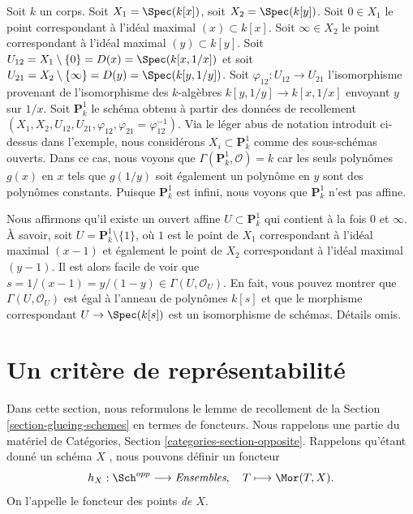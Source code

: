 \begin{example}
\label{example-projective-line}
Soit  $k$  un corps. Soit  $X_1 = \Spec(k[x])$, soit  $X_2 = \Spec(k[y])$. Soit
 $0 \in X_1$  le point correspondant à l'idéal maximal  $(x) \subset k[x]$. Soit
 $\infty \in X_2$  le point correspondant à l'idéal maximal  $(y) \subset k[y]$. Soit
 $U_{12} = X_1 \setminus \{0\} = D(x) = \Spec(k[x, 1/x])$  et soit  $U_{21} = X_2 \setminus \{\infty\} = D(y) = \Spec(k[y, 1/y])$. Soit  $\varphi_{12} : U_{12} \to U_{21}$  l'isomorphisme provenant de
l'isomorphisme des  $k$-algèbres  $k[y, 1/y] \to k[x, 1/x]$  envoyant  $y$  sur
 $1/x$. Soit  $\mathbf{P}^1_k$  le schéma obtenu à partir des données de
recollement  $(X_1, X_2, U_{12}, U_{21}, \varphi_{12},
\varphi_{21} = \varphi_{12}^{-1})$. Via le léger abus de notation introduit ci-dessus dans
l'exemple, nous considérons  $X_i \subset \mathbf{P}^1_k$  comme des sous-schémas ouverts. Dans ce
cas, nous voyons que  $\Gamma(\mathbf{P}^1_k, \mathcal{O}) = k$  car les seuls polynômes  $g(x)$  en
 $x$  tels que  $g(1/y)$  soit également un polynôme en  $y$ 
sont des polynômes constants. Puisque  $\mathbf{P}^1_k$  est infini, nous voyons que
 $\mathbf{P}^1_k$  n'est pas affine.

\medskip\noindent
Nous affirmons qu'il existe un ouvert affine  $U \subset \mathbf{P}^1_k$  qui contient à la fois
 $0$  et  $\infty$. À savoir, soit  $U = \mathbf{P}^1_k \setminus \{1\}$, où  $1$  est le
point de  $X_1$  correspondant à l'idéal maximal  $(x - 1)$  et également le
point de  $X_2$  correspondant à l'idéal maximal  $(y - 1)$. Il est alors
facile de voir que  $s = 1/(x - 1) = y/(1 - y) \in \Gamma(U, \mathcal{O}_U)$. En fait, vous pouvez montrer que  $\Gamma(U, \mathcal{O}_U)$  est
égal à l'anneau de polynômes  $k[s]$  et que le morphisme correspondant
 $U \to \Spec(k[s])$  est un isomorphisme de schémas. Détails omis.
\end{example}




\section{Un critère de représentabilité}
\label{section-representable}

\noindent
Dans cette section, nous reformulons le lemme de recollement de la Section
 \ref{section-glueing-schemes}  en termes de foncteurs. Nous rappelons une partie du matériel de
Catégories, Section  \ref{categories-section-opposite}. Rappelons qu'étant donné un schéma  $X$ ,
nous pouvons définir un foncteur
$$
h_X : \Sch^{opp}
\longrightarrow
\textit{Ensembles}, \quad
T \longmapsto \Mor(T, X).
$$
On l'appelle le foncteur des points  {\it  de
 $X$}.

